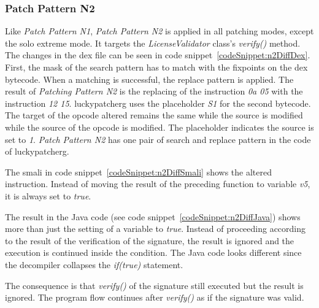 \subsubsection{Patch Pattern N2}
Like \textit{Patch Pattern N1}, \textit{Patch Pattern N2} is applied in all patching modes, except the solo extreme mode.
It targets the \textit{LicenseValidator} class's \textit{verify()} method.
\newline
The changes in the \gls{dex} file can be seen in code snippet~\ref{codeSnippet:n2DiffDex}.
First, the mask of the search pattern has to match with the fixpoints on the dex bytecode.
When a matching is successful, the replace pattern is applied.
The result of \textit{Patching Pattern N2} is the replacing of the instruction \textit{0a 05} with the instruction \textit{12 15}.
\gls{luckypatcherg} uses the placeholder \textit{S1} for the second bytecode.
The target of the opcode altered remains the same while the source is modified while the source of the opcode is modified.
The placeholder indicates the source is set to \textit{1}.
\textit{Patch Pattern N2} has one pair of search and replace pattern in the code of \gls{luckypatcherg}.
\newline

The smali in code snippet~\ref{codeSnippet:n2DiffSmali} shows the altered instruction.
Instead of moving the result of the preceding function to variable \textit{v5}, it is always set to \textit{true}.
\newline

The result in the Java code (see code snippet~\ref{codeSnippet:n2DiffJava}) shows more than just the setting of a variable to \textit{true}.
Instead of proceeding according to the result of the verification of the signature, the result is ignored and the execution is continued inside the condition.
The Java code looks different since the decompiler collapses the \textit{if(true)} statement.
\newline

The consequence is that \textit{verify()} of the signature still executed but the result is ignored.
The program flow continues after  \textit{verify()} as if the signature was valid.

